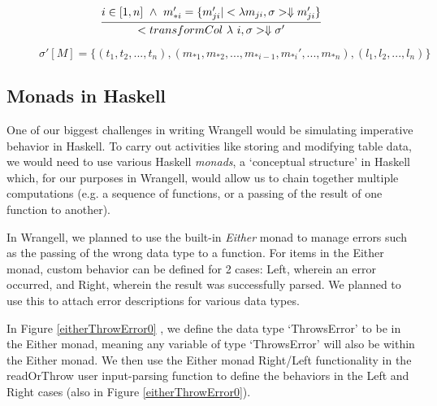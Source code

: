 \documentclass[preprint,nocopyrightspace]{sig-alternate}
\begin{document}
\begin{figure}
\begin{enumerate}
\begin{equation*}
\infer{<transformCol \ \lambda \ i, \sigma> \Downarrow \\
\sigma ' 
}{i \in [1,n]  \ \wedge \  m_{*i}' = \{m_{ji}'|<\lambda m_{ji}, \sigma> \Downarrow m_{ji}'\}}
\end{equation*}

$\sigma ' [ M ] = \{(t_1,t_2,...,t_n),(m_{*1},m_{*2},...,m_{*i-1},m_{*i}',...,m_{*n}), (l_1,l_2,...,l_n)\}$

\end{enumerate}
\label{bigStep}
\end{figure}

\twocolumn

\begin{comment}
TODO: update code segments and big-step semantics and syntax of wrangell
\end{comment}


\subsection{Monads in Haskell}
One of our biggest challenges in writing Wrangell would be simulating imperative behavior in Haskell.  
To carry out activities like storing and modifying table data, we would need to use various Haskell \emph{monads}, a `conceptual structure' \cite{gentleMonads} in Haskell which, for our purposes in Wrangell, would allow us to chain together multiple computations (e.g. a sequence of functions, or a passing of the result of one function to another).

In Wrangell, we planned to use the built-in \emph{Either} monad to manage errors such as the passing of the wrong data type to a function. For items in the Either monad, custom behavior can be defined for 2 cases: Left, wherein an error occurred, and Right, wherein the result was successfully parsed. We planned to use this to attach error descriptions for various data types.  

In Figure \ref{eitherThrowError0} , we define the data type `ThrowsError' to be in the Either monad, meaning any variable of type `ThrowsError' will also be within the Either monad. We then use the Either monad Right/Left functionality in the readOrThrow user input-parsing function to define the behaviors in the Left and Right cases (also in Figure \ref{eitherThrowError0}).
\end{document}
